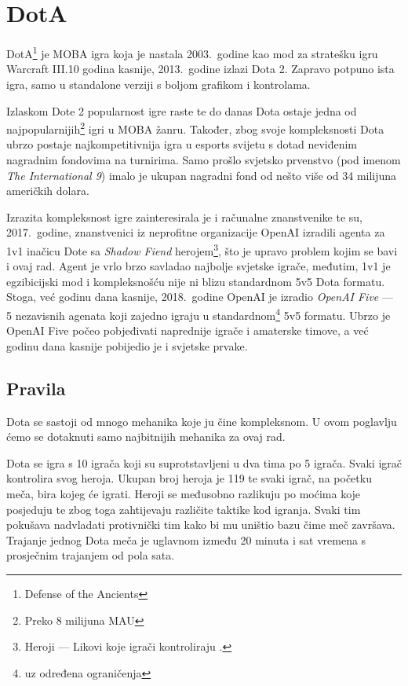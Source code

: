 \documentclass[times, utf8, zavrsni, numeric]{fer}
\begin{document}
\section{DotA}

DotA\footnote{Defense of the Ancients} je MOBA igra koja je nastala 2003.\
godine kao mod za stratešku igru Warcraft III.\@ 10 godina kasnije, 2013.\
godine izlazi Dota 2. Zapravo potpuno ista igra, samo u standalone verziji s
boljom grafikom i kontrolama.

Izlaskom Dote 2 popularnost igre raste te do danas Dota ostaje jedna od
najpopularnijih\footnote{Preko 8 milijuna MAU } igri
u MOBA žanru.  Također, zbog svoje kompleksnosti Dota ubrzo postaje
najkompetitivnija igra u esports svijetu s dotad neviđenim nagradnim fondovima
na turnirima. Samo prošlo svjetsko prvenstvo (pod imenom \emph{The International
9}) imalo je ukupan nagradni fond od nešto više od 34 milijuna američkih
dolara.\citep{liquipedia-ti9}

Izrazita kompleksnost igre zainteresirala je i računalne znanstvenike te su,
2017.\ godine, znanstvenici iz neprofitne organizacije OpenAI izradili agenta za
1v1 inačicu Dote sa \emph{Shadow Fiend} herojem\footnote{Heroji --- Likovi koje
igrači kontroliraju \engl{Hero}.}, što je upravo problem kojim se bavi i ovaj
rad. Agent je vrlo brzo savladao najbolje svjetske
igrače\citep{openai-1v1}, međutim, 1v1 je
egzibicijski mod i kompleksnošću nije ni blizu standardnom 5v5 Dota formatu.
Stoga, već godinu dana kasnije, 2018.\ godine OpenAI je izradio \emph{OpenAI
Five} --- 5 nezavisnih agenata koji zajedno igraju u standardnom\footnote{uz
određena ograničenja} 5v5 formatu.  Ubrzo je OpenAI Five počeo pobjeđivati
naprednije igrače i amaterske timove, a već godinu dana kasnije pobijedio je i
svjetske prvake.\citep{openai-five}

\subsection{Pravila}

Dota se sastoji od mnogo mehanika koje ju čine kompleksnom. U ovom poglavlju
ćemo se dotaknuti samo najbitnijih mehanika za ovaj rad.

Dota se igra s 10 igrača koji su suprotstavljeni u dva tima po 5 igrača.  Svaki
igrač kontrolira svog heroja.  Ukupan broj heroja je 119 te svaki igrač, na
početku meča, bira kojeg će igrati.  Heroji se međusobno razlikuju po moćima
koje posjeduju te zbog toga zahtijevaju različite taktike kod igranja.  Svaki
tim pokušava nadvladati protivnički tim kako bi mu uništio bazu čime meč
završava.  Trajanje jednog Dota meča je uglavnom između 20 minuta i sat vremena
s prosječnim trajanjem od pola sata.
\end{document}
